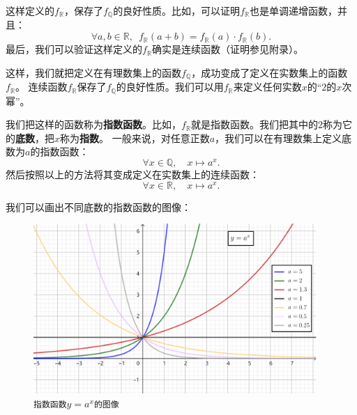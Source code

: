 \documentclass[12pt,UTF8]{ctexbook}
\begin{document}
这样定义的$f_{\mathbb{R}}$，保存了$f_{\mathbb{Q}}$的良好性质。比如，可以证明$f_{\mathbb{R}}$也是单调递增函数，并且：
$$ \forall a, b \in \mathbb{R}, \,\,\, f_{\mathbb{R}}(a + b) = f_{\mathbb{R}}(a) \cdot f_{\mathbb{R}}(b).$$
最后，我们可以验证这样定义的$f_{\mathbb{R}}$确实是连续函数（证明参见附录）。

这样，我们就把定义在有理数集上的函数$f_{\mathbb{Q}}$，成功变成了定义在实数集上的函数$f_{\mathbb{R}}$。
连续函数$f_{\mathbb{R}}$保存了$f_{\mathbb{Q}}$的良好性质。我们可以用$f_{\mathbb{R}}$来定义任何实数$x$的“$2$的$x$次幂”。

我们把这样的函数称为\textbf{指数函数}。比如，$f_{\mathbb{R}}$就是指数函数。我们把其中的$2$称为它的\textbf{底数}，把$x$称为\textbf{指数}。
一般来说，对任意正数$a$，我们可以在有理数集上定义底数为$a$的指数函数：
$$ \forall x\in\mathbb{Q}, \quad x\mapsto a^x.$$
然后按照以上的方法将其变成定义在实数集上的连续函数：
$$ \forall x\in\mathbb{R}, \quad x\mapsto a^x.$$

我们可以画出不同底数的指数函数的图像：

\begin{figure}[h]
    \vspace{4pt}
    \centering
    \includegraphics[width=0.96\textwidth]{tu/指数函数1.png}
    \caption*{\texttt{指数函数}$y = a^x$\texttt{的图像}}
\end{figure}
\end{document}
